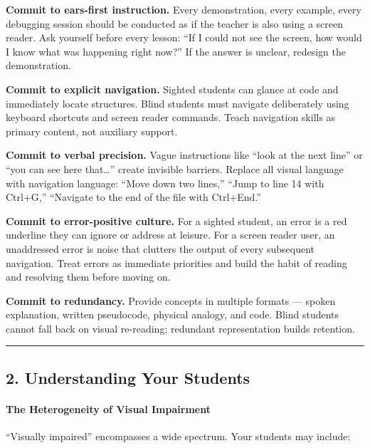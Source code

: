 \documentclass[
  justified,
  openright,
]{tufte-book}
\let\subsubsection\paragraph
\let\paragraph\paragraph
\let\subsubsection\paragraph
\let\paragraph\paragraph
\begin{document}
\textbf{Commit to ears-first instruction.} Every demonstration, every
example, every debugging session should be conducted as if the teacher
is also using a screen reader. Ask yourself before every lesson: ``If I
could not see the screen, how would I know what was happening right
now?'' If the answer is unclear, redesign the demonstration.

\textbf{Commit to explicit navigation.} Sighted students can glance at
code and immediately locate structures. Blind students must navigate
deliberately using keyboard shortcuts and screen reader commands. Teach
navigation skills as primary content, not auxiliary support.

\textbf{Commit to verbal precision.} Vague instructions like ``look at
the next line'' or ``you can see here that\ldots{}'' create invisible
barriers. Replace all visual language with navigation language: ``Move
down two lines,'' ``Jump to line 14 with Ctrl+G,'' ``Navigate to the end
of the file with Ctrl+End.''

\textbf{Commit to error-positive culture.} For a sighted student, an
error is a red underline they can ignore or address at leisure. For a
screen reader user, an unaddressed error is noise that clutters the
output of every subsequent navigation. Treat errors as immediate
priorities and build the habit of reading and resolving them before
moving on.

\textbf{Commit to redundancy.} Provide concepts in multiple formats ---
spoken explanation, written pseudocode, physical analogy, and code.
Blind students cannot fall back on visual re-reading; redundant
representation builds retention.

\begin{center}\rule{0.5\linewidth}{0.5pt}\end{center}

\subsection{2. Understanding Your
Students}\label{understanding-your-students}

\subsubsection{The Heterogeneity of Visual
Impairment}\label{the-heterogeneity-of-visual-impairment}

``Visually impaired'' encompasses a wide spectrum. Your students may
include:
\end{document}
